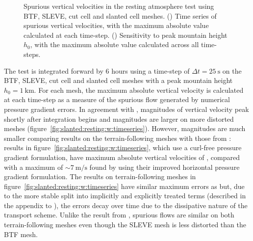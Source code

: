 \begin{figure}
	\centering
	\begin{subfigure}{\textwidth}
		\centering
		
		\label{fig:slanted:resting:w:timeseries}
		\label{fig:slanted:resting:w:max}
	\end{subfigure}
	\caption{Spurious vertical velocities in the resting atmosphere test using BTF, SLEVE, cut cell and slanted cell meshes.
	() Time series of spurious vertical velocities, with the maximum absolute value calculated at each time-step. 
	() Sensitivity to peak mountain height $h_0$, with the maximum absolute value calculated across all time-steps.
	}
	\label{fig:slanted:resting:w}
\end{figure}

The test is integrated forward by \num{6} hours using a time-step of $\Delta t = \SI{25}{\second}$ on the BTF, SLEVE, cut cell and slanted cell meshes with a peak mountain height $h_0 = \SI{1}{\kilo\meter}$.
For each mesh, the maximum absolute vertical velocity is calculated at each time-step as a measure of the spurious flow generated by numerical pressure gradient errors.  In agreement with \citep{klemp2011}, magnitudes of vertical velocity peak shortly after integration begins and magnitudes are larger on more distorted meshes (figure~\ref{fig:slanted:resting:w:timeseries}).
However, magnitudes are much smaller comparing results on the terrain-following meshes with those from \citet{klemp2011}: results in figure~\ref{fig:slanted:resting:w:timeseries}, which use a curl-free pressure gradient formulation, have maximum absolute vertical velocities of \unskip, compared with a maximum of $\sim \SI{7}{\meter\per\second}$ found by \citet{klemp2011} using their improved horizontal pressure gradient formulation.
The results on terrain-following meshes in figure~\ref{fig:slanted:resting:w:timeseries} have similar maximum errors as \citet{weller-shahrokhi2014} but, due to the more stable split into implicitly and explicitly treated terms (described in the appendix to \citet{shaw-weller2016}), the errors decay over time due to the dissipative nature of the transport scheme.
Unlike the result from \citet{klemp2011}, spurious flows are similar on both terrain-following meshes even though the SLEVE mesh is less distorted than the BTF mesh.

